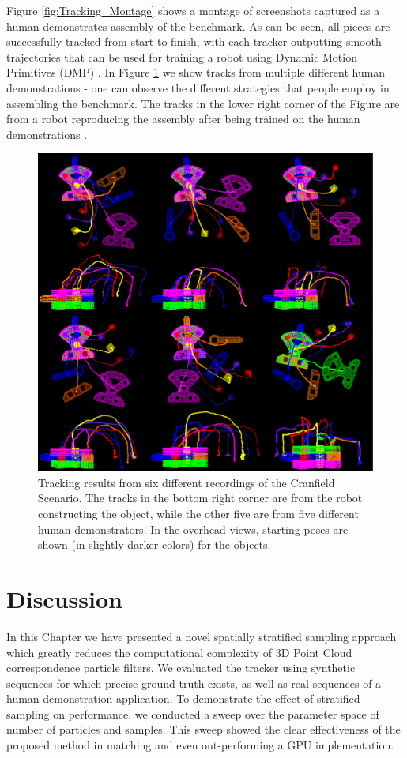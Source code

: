 Figure \ref{fig:Tracking_Montage} shows a montage of screenshots captured as a human demonstrates assembly of the benchmark. As can be seen, all pieces are successfully tracked from start to finish, with each tracker outputting smooth trajectories that can be used for training a robot using Dynamic Motion Primitives (DMP) \cite{Kulvicius2012}. In Figure \ref{fig:TrackingResults} we show tracks from multiple different human demonstrations - one can observe the different strategies that people employ in assembling the benchmark. The tracks in the lower right corner of the Figure are from a robot reproducing the assembly after being trained on the human demonstrations \cite{Rossman_ICRA2014}. 

\begin{figure}[!ht]
  \centering
  \includegraphics[width=1.0\textwidth]{figures/Tracking/TracksMontage.pdf}
  \caption[Snapshots from Virtual Reality Benchmark Run]{Tracking results from six different recordings of the Cranfield Scenario. The tracks in the bottom right corner are from the robot constructing the object, while the other five are from five different human demonstrators. In the overhead views, starting poses are shown (in slightly darker colors) for the objects.}
  \label{fig:TrackingResults}
\end{figure}

\section{Discussion}
In this Chapter we have presented a novel spatially stratified sampling approach which greatly reduces the computational complexity of 3D Point Cloud correspondence particle filters. We evaluated the tracker using synthetic sequences for which precise ground truth exists, as well as real sequences of a human demonstration application. To demonstrate the effect of stratified sampling on performance, we conducted a sweep over the parameter space of number of particles and samples. This sweep showed the clear effectiveness of the proposed method in matching and even out-performing a GPU implementation. 

